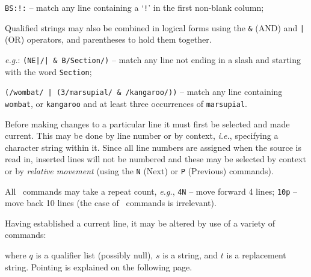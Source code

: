 {\tt BS:!:} -- match any line containing a `{\tt !}' in the first non-blank
column;

Qualified strings may also be combined in logical forms using the {\tt \&} (AND)
and {\tt |} (OR) operators, and parentheses to hold them together.

{\it e.g.}: {\tt (NE|/| \& B/Section/)} -- match any
line not ending in a slash and starting with the word {\tt Section};

{\tt (/wombat/ | (3/marsupial/ \& /kangaroo/))} -- match any line
containing {\tt wombat}, or {\tt kangaroo} and at least three
occurrences of {\tt marsupial}.

Before making changes to a particular line it must first be selected
and made current.  This may be done by line number or by context,
{\it i.e.}, specifying a character string within it.  Since all
line numbers are assigned when the source is read in, inserted lines
will not be numbered and these may be selected by context or by
{\it relative movement} (using the {\tt N} (Next) or {\tt P} (Previous)
commands).

All \ZED\ commands may take a repeat count, {\it e.g.},
{\tt 4N} -- move forward 4 lines; {\tt 10p} -- move back 10 lines
(the case of \ZED\ commands is irrelevant).

Having established a current line, it may be altered by use of
a variety of commands:
\smallskip
{}

where $q$ is a qualifier list (possibly null), $s$ is a string,
and $t$ is a replacement string.  Pointing is explained on the
following page.

